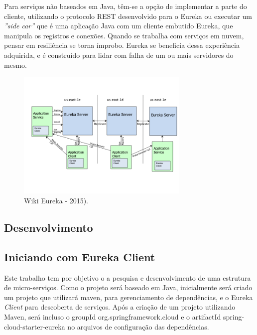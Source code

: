 \documentclass[journal]{IEEEtran}
\begin{document}
Para serviços não baseados em Java, têm-se a opção de implementar a parte do cliente, utilizando o protocolo REST desenvolvido para o Eureka ou executar um \emph{''side car''} que é uma aplicação Java com um cliente embutido Eureka, que manipula os registros e conexões. Quando se trabalha com serviços em nuvem, pensar em resiliência se torna ímprobo. Eureka se beneficia dessa experiência adquirida, e é construído para lidar com falha de um ou mais servidores do mesmo.

\begin{figure}[h]
\centering
\includegraphics[height=6.2cm]{figura6}
\caption{Wiki Eureka - 2015).}
\label{fig:wiki-eureka-est}
\end{figure}
 

\subsection{Desenvolvimento}

\subsection{Iniciando com Eureka Client}

Este trabalho tem por objetivo o a pesquisa e desenvolvimento de uma estrutura de micro-serviços. Como o projeto será baseado em Java, inicialmente será criado um projeto que utilizará maven, para gerenciamento de dependências, e o Eureka \emph{Client} para descoberta de serviços. Após a criação de um projeto utilizando Maven, será incluso o groupId org.springframework.cloud e o artifactId spring-cloud-starter-eureka no arquivos de configuração das dependências.
\end{document}
